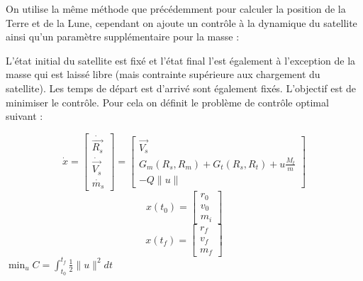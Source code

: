 \documentclass[11pt]{article} %
\begin{document}
		On utilise la même méthode que précédemment pour calculer la position de la Terre et de la Lune, cependant on ajoute un contrôle à la dynamique du satellite ainsi qu'un paramètre supplémentaire pour la masse :
		
		
		L'état initial du satellite est fixé et l'état final l'est également à l'exception de la masse qui est laissé libre (mais contrainte supérieure aux chargement du satellite). Les temps de départ est d'arrivé sont également fixés.
		L'objectif est de minimiser le contrôle. Pour cela on définit le problème de contrôle optimal suivant :
		
		$$
		\dot{x}=
		\begin{bmatrix}
			\dot{\overrightarrow{R_{s}}}\\
			\dot{\overrightarrow{V_{s}}}\\
			\dot{m_{s}}
		\end{bmatrix} =\begin{bmatrix}
			\overrightarrow{V_{s}}\\
			G_{m}(R_s,R_m)+G_{t}(R_s,R_t)+u\frac{M_{t}}{m}\\
			-Q\|u\|
		\end{bmatrix}
		$$
		$$
			x(t_0)=\begin{bmatrix}
				r_0\\
				v_0\\
				m_i
			\end{bmatrix}
		$$
		$$
		x(t_f)=\begin{bmatrix}
			r_f\\
			v_f\\
			m_f
		\end{bmatrix}
		$$
		$\min_{u}C=\int_{t_0}^{t_f}\frac{1}{2}\|u\|^2dt$
		
\end{document}
